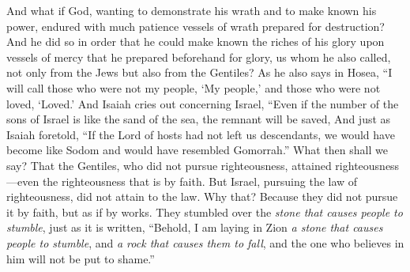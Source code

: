 \begin{biblechapter}
\verse And what if God, wanting to demonstrate his wrath and to make known his power, endured with much patience vessels of wrath prepared for destruction?
\verse And he did so in order that he could make known the riches of his glory upon vessels of mercy that he prepared beforehand for glory,
\verse us whom he also called, not only from the Jews but also from the Gentiles?
\verse As he also says in Hosea,
\verse “I will call those who were not my people, ‘My people,’ 
and those who were not loved, ‘Loved.’
\verse And Isaiah cries out concerning Israel,
\verse “Even if the number of the sons of Israel is like the sand of the sea, 
the remnant will be saved,
\verse And just as Isaiah foretold, “If the Lord of hosts had not left us descendants, 
we would have become like Sodom 
and would have resembled Gomorrah.”
\verse What then shall we say? That the Gentiles, who did not pursue righteousness, attained righteousness—even the righteousness that is by faith.
\verse But Israel, pursuing the law of righteousness, did not attain to the law.
\verse Why that? Because they did not pursue it by faith, but as if by works. They stumbled over the \textit{stone that causes people to stumble},
\verse just as it is written, “Behold, I am laying in Zion \textit{a stone that causes people to stumble}, 
and \textit{a rock that causes them to fall}, 
and the one who believes in him will not be put to shame.”
\end{biblechapter}

